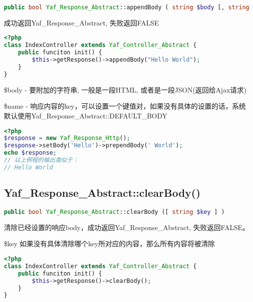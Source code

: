 \begin{lstlisting}[language=PHP]
public bool Yaf_Response_Abstract::appendBody ( string $body [, string $name ] )
\end{lstlisting}

成功返回Yaf\_Response\_Abstract, 失败返回FALSE

\begin{lstlisting}[language=PHP]
<?php
class IndexController extends Yaf_Controller_Abstract {
    public funciton init() {
        $this->getResponse()->appendBody("Hello World");
    }
}
\end{lstlisting}


\begin{compactitem}
\item \$body - 要附加的字符串, 一般是一段HTML, 或者是一段JSON(返回给Ajax请求)
\item \$name - 响应内容的key，可以设置一个键值对，如果没有具体的设置的话，系统默认使用Yaf\_Response\_Abstract::DEFAULT\_BODY
\end{compactitem}

\begin{lstlisting}[language=PHP]
<?php
$response = new Yaf_Response_Http();
$response->setBody('Hello')->prependBody(' World');
echo $response;
// 以上例程的输出类似于：
// Hello World
\end{lstlisting}



\subsection{Yaf\_Response\_Abstract::clearBody()}

\begin{lstlisting}[language=PHP]
public bool Yaf_Response_Abstract::clearBody ([ string $key ] )
\end{lstlisting}

清除已经设置的响应body，成功返回Yaf\_Response\_Abstract, 失败返回FALSE。



\begin{compactitem}
\item \$key 如果没有具体清除哪个key所对应的内容，那么所有内容将被清除
\end{compactitem}



\begin{lstlisting}[language=PHP]
<?php
class IndexController extends Yaf_Controller_Abstract {
    public funciton init() {
        $this->getResponse()->clearBody();
    }
}
\end{lstlisting}

